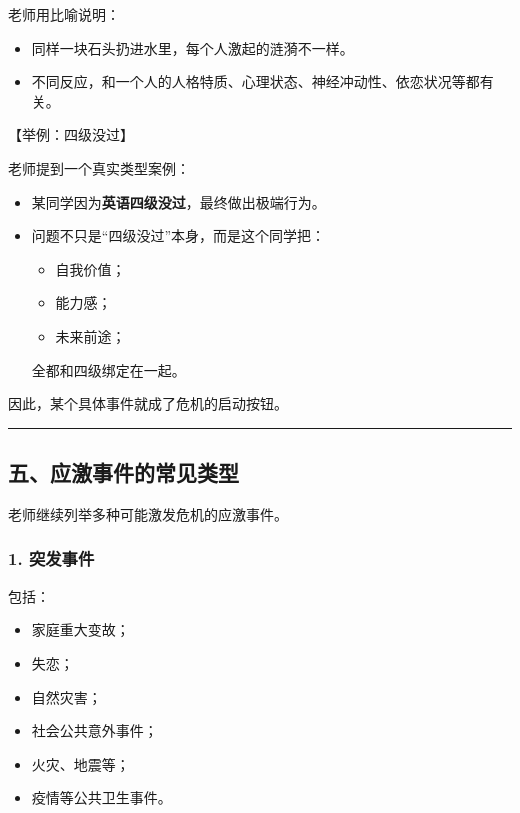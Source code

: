 \documentclass[
  chinese,
  9pt,
  a4paper,
]{ctexart}
\providecommand{\tightlist}{%
  \setlength{\itemsep}{0pt}\setlength{\parskip}{0pt}}
\begin{document}
老师用比喻说明：

\begin{itemize}
\tightlist
\item
  同样一块石头扔进水里，每个人激起的涟漪不一样。
\item
  不同反应，和一个人的人格特质、心理状态、神经冲动性、依恋状况等都有关。
\end{itemize}

【举例：四级没过】

老师提到一个真实类型案例：

\begin{itemize}
\item
  某同学因为\textbf{英语四级没过}，最终做出极端行为。
\item
  问题不只是``四级没过''本身，而是这个同学把：

  \begin{itemize}
  \tightlist
  \item
    自我价值；
  \item
    能力感；
  \item
    未来前途；
  \end{itemize}

  全都和四级绑定在一起。
\end{itemize}

因此，某个具体事件就成了危机的启动按钮。

\begin{center}\rule{0.5\linewidth}{0.5pt}\end{center}

\subsection{五、应激事件的常见类型}\label{ux4e94ux5e94ux6fc0ux4e8bux4ef6ux7684ux5e38ux89c1ux7c7bux578b}

老师继续列举多种可能激发危机的应激事件。

\subsubsection{1. 突发事件}\label{ux7a81ux53d1ux4e8bux4ef6}

包括：

\begin{itemize}
\tightlist
\item
  家庭重大变故；
\item
  失恋；
\item
  自然灾害；
\item
  社会公共意外事件；
\item
  火灾、地震等；
\item
  疫情等公共卫生事件。
\end{itemize}
\end{document}
